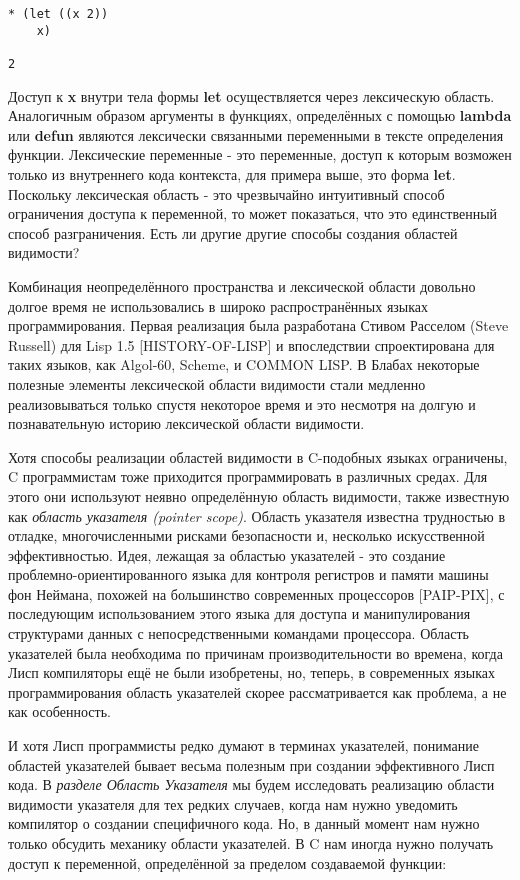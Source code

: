\begin{verbatim}
* (let ((x 2))
    x)

2
\end{verbatim}

Доступ к \textbf{x} внутри тела формы \textbf{let} осуществляется через лексическую область. Аналогичным образом аргументы в функциях, определённых с помощью \textbf{lambda} или \textbf{defun} являются лексически связанными переменными в тексте определения функции. Лексические переменные - это переменные, доступ к которым возможен только из внутреннего кода контекста, для примера выше, это форма \textbf{let}. Поскольку лексическая область - это чрезвычайно интуитивный способ ограничения доступа к переменной, то может показаться, что это единственный способ разграничения. Есть ли другие другие способы создания областей видимости?

Комбинация неопределённого пространства и лексической области довольно долгое время не использовались в широко распространённых языках программирования. Первая реализация была разработана Стивом Расселом (Steve Russell) для Lisp 1.5 [HISTORY-OF-LISP] и впоследствии спроектирована для таких языков, как Algol-60, Scheme, и COMMON LISP. В Блабах некоторые полезные элементы лексической области видимости стали медленно реализовываться только спустя некоторое время и это несмотря на долгую и познавательную историю лексической области видимости.

Хотя способы реализации областей видимости в C-подобных языках ограничены, C программистам тоже приходится программировать в различных средах. Для этого они используют неявно определённую область видимости, также известную как \emph{область указателя (pointer scope)}. Область указателя известна трудностью в отладке, многочисленными рисками безопасности и, несколько искусственной эффективностью. Идея, лежащая за областью указателей - это создание проблемно-ориентированного языка для контроля регистров и памяти машины фон Неймана, похожей на большинство современных процессоров [PAIP-PIX], с последующим использованием этого языка для доступа и манипулирования структурами данных с непосредственными командами процессора. Область указателей была необходима по причинам производительности во времена, когда Лисп компиляторы ещё не были изобретены, но, теперь, в современных языках программирования область указателей скорее рассматривается как проблема, а не как особенность.

И хотя Лисп программисты редко думают в терминах указателей, понимание областей указателей бывает весьма полезным при создании эффективного Лисп кода. В \emph{разделе Область Указателя} мы будем исследовать реализацию области видимости указателя для тех редких случаев, когда нам нужно уведомить компилятор о создании специфичного кода. Но, в данный момент нам нужно только обсудить механику области указателей. В C нам иногда нужно получать доступ к переменной, определённой за пределом создаваемой функции:

